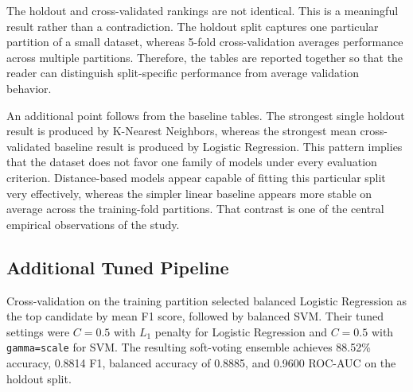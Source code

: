 \documentclass[conference]{IEEEtran}
\begin{document}
\begin{table}[!t]
\caption{Selected baseline 5-fold cross-validation results}
\label{tab:baselinecv}
\centering
\footnotesize
\setlength{\tabcolsep}{4pt}
\end{table}

\noindent The holdout and cross-validated rankings are not identical. This is a meaningful result rather than a contradiction. The holdout split captures one particular partition of a small dataset, whereas 5-fold cross-validation averages performance across multiple partitions. Therefore, the tables are reported together so that the reader can distinguish split-specific performance from average validation behavior.

An additional point follows from the baseline tables. The strongest single holdout result is produced by K-Nearest Neighbors, whereas the strongest mean cross-validated baseline result is produced by Logistic Regression. This pattern implies that the dataset does not favor one family of models under every evaluation criterion. Distance-based models appear capable of fitting this particular split very effectively, whereas the simpler linear baseline appears more stable on average across the training-fold partitions. That contrast is one of the central empirical observations of the study.

\subsection{Additional Tuned Pipeline}
Cross-validation on the training partition selected balanced Logistic Regression as the top candidate by mean F1 score, followed by balanced SVM. Their tuned settings were $C=0.5$ with $L_1$ penalty for Logistic Regression and $C=0.5$ with \texttt{gamma=scale} for SVM. The resulting soft-voting ensemble achieves 88.52\% accuracy, 0.8814 F1, balanced accuracy of 0.8885, and 0.9600 ROC-AUC on the holdout split.
\end{document}
